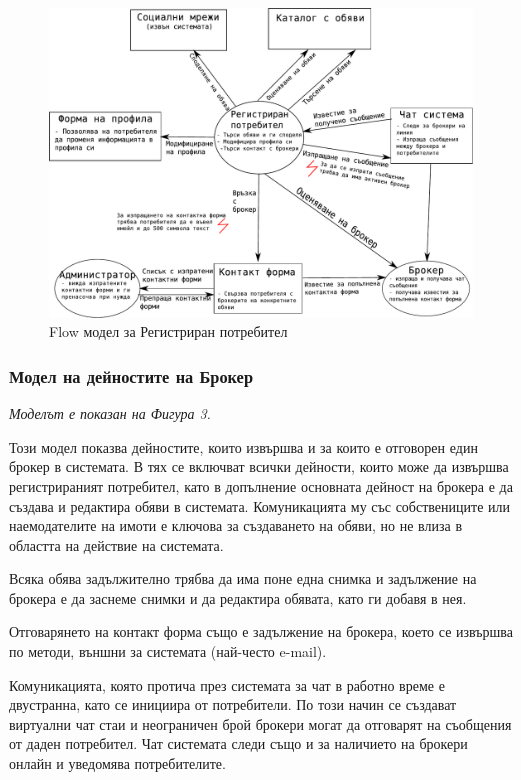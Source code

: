 \documentclass[a4paper]{article}
\begin{document}
	\begin{figure}[h]
	\centering
	\includegraphics[scale=0.75]{flow-registered-user}
	\caption{Flow модел за Регистриран потребител}
	\end{figure}

\subsubsection{Модел на дейностите на Брокер}	

\emph{Моделът е показан на Фигура 3.} 

Този модел показва дейностите, които извършва и за които е отговорен един брокер в системата. В тях се включват всички дейности, които може да извършва регистрираният потребител, като в допълнение основната дейност на брокера е да създава и редактира обяви в системата. Комуникацията му със собствениците или наемодателите на имоти е ключова за създаването на обяви, но не влиза в областта на действие на системата.
 
Всяка обява задължително трябва да има поне една снимка и задължение на брокера е да заснеме снимки и да редактира обявата, като ги добавя в нея.

Отговарянето на контакт форма също е задължение на брокера, което се извършва по методи, външни за системата (най-често e-mail). 

Комуникацията, която протича през системата за чат в работно време е двустранна, като се инициира от потребители. По този начин се създават виртуални чат стаи и неограничен брой брокери могат да отговарят на съобщения от даден потребител. Чат системата следи също и за наличието на брокери онлайн и уведомява потребителите. 
\end{document}
